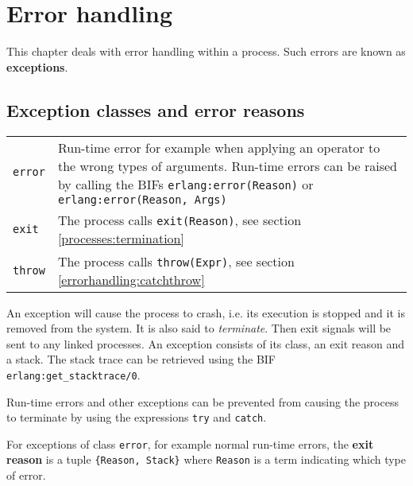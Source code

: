 \chapter{Error handling}
\label{errorhandling}

This chapter deals with error handling within a process. Such errors
are known as \textbf{exceptions}.


\section{Exception classes and error reasons}

\begin{center}
\begin{tabular}{|>{\raggedright}p{49pt}|>{\raggedright}p{277pt}|}
\hline
\multicolumn{2}{|p{326pt}|}{Exception classes}\tabularnewline
\hline
\texttt{error} & Run-time error for example when applying an operator to the wrong types of arguments. Run-time errors can be raised by calling
	the BIFs \texttt{erlang:error(Reason)} or \texttt{erlang:error(Reason, Args)} \tabularnewline
\hline
\texttt{exit}  & The process calls \texttt{exit(Reason)}, see section \ref{processes:termination}\tabularnewline
\hline
\texttt{throw}  & The process calls \texttt{throw(Expr)}, see section \ref{errorhandling:catchthrow}\tabularnewline
\hline
\end{tabular}
\end{center}

An exception will cause the process to crash, i.e. its execution is
stopped and it is removed from the system. It is also said to
\emph{terminate}. Then exit signals will be sent to any linked
processes.\emph{ }An exception consists of its class, an exit reason
and a stack. The stack trace can be retrieved using the BIF
\texttt{erlang:get\_stacktrace/0}.

Run-time errors and other exceptions can be prevented from causing the
process to terminate by using the expressions \texttt{try} and \texttt{catch}.

For exceptions of class \texttt{error}, for example normal run-time errors, the
\textbf{exit reason} is a tuple \texttt{\{Reason, Stack\}} where
\texttt{Reason} is a term indicating which type of error.

